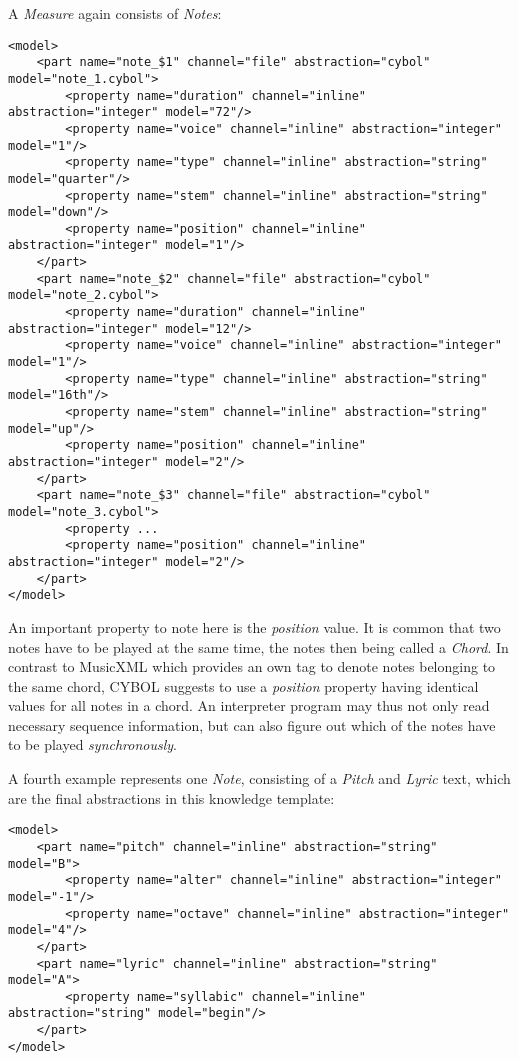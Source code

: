 A \emph{Measure} again consists of \emph{Notes}:

\begin{scriptsize}
    \begin{verbatim}
<model>
    <part name="note_$1" channel="file" abstraction="cybol" model="note_1.cybol">
        <property name="duration" channel="inline" abstraction="integer" model="72"/>
        <property name="voice" channel="inline" abstraction="integer" model="1"/>
        <property name="type" channel="inline" abstraction="string" model="quarter"/>
        <property name="stem" channel="inline" abstraction="string" model="down"/>
        <property name="position" channel="inline" abstraction="integer" model="1"/>
    </part>
    <part name="note_$2" channel="file" abstraction="cybol" model="note_2.cybol">
        <property name="duration" channel="inline" abstraction="integer" model="12"/>
        <property name="voice" channel="inline" abstraction="integer" model="1"/>
        <property name="type" channel="inline" abstraction="string" model="16th"/>
        <property name="stem" channel="inline" abstraction="string" model="up"/>
        <property name="position" channel="inline" abstraction="integer" model="2"/>
    </part>
    <part name="note_$3" channel="file" abstraction="cybol" model="note_3.cybol">
        <property ...
        <property name="position" channel="inline" abstraction="integer" model="2"/>
    </part>
</model>
    \end{verbatim}
\end{scriptsize}

An important property to note here is the \emph{position} value. It is common
that two notes have to be played at the same time, the notes then being called
a \emph{Chord}. In contrast to MusicXML which provides an own tag to denote
notes belonging to the same chord, CYBOL suggests to use a \emph{position}
property having identical values for all notes in a chord. An interpreter
program may thus not only read necessary sequence information, but can also
figure out which of the notes have to be played \emph{synchronously}.

A fourth example represents one \emph{Note}, consisting of a \emph{Pitch} and
\emph{Lyric} text, which are the final abstractions in this knowledge template:

\begin{scriptsize}
    \begin{verbatim}
<model>
    <part name="pitch" channel="inline" abstraction="string" model="B">
        <property name="alter" channel="inline" abstraction="integer" model="-1"/>
        <property name="octave" channel="inline" abstraction="integer" model="4"/>
    </part>
    <part name="lyric" channel="inline" abstraction="string" model="A">
        <property name="syllabic" channel="inline" abstraction="string" model="begin"/>
    </part>
</model>
    \end{verbatim}
\end{scriptsize}
